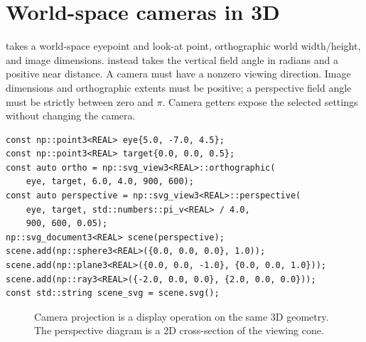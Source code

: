 \section{World-space cameras in 3D}
 takes a world-space eyepoint and look-at
point, orthographic world width/height, and image dimensions.
 instead takes the vertical field angle in
radians and a positive near distance. A camera must have a nonzero viewing
direction. Image dimensions and orthographic extents must be positive; a
perspective field angle must be strictly between zero and $\pi$. Camera
getters expose the selected settings without changing the camera.

\begin{lstlisting}
const np::point3<REAL> eye{5.0, -7.0, 4.5};
const np::point3<REAL> target{0.0, 0.0, 0.5};
const auto ortho = np::svg_view3<REAL>::orthographic(
    eye, target, 6.0, 4.0, 900, 600);
const auto perspective = np::svg_view3<REAL>::perspective(
    eye, target, std::numbers::pi_v<REAL> / 4.0,
    900, 600, 0.05);
np::svg_document3<REAL> scene(perspective);
scene.add(np::sphere3<REAL>({0.0, 0.0, 0.0}, 1.0));
scene.add(np::plane3<REAL>({0.0, 0.0, -1.0}, {0.0, 0.0, 1.0}));
scene.add(np::ray3<REAL>({-2.0, 0.0, 0.0}, {2.0, 0.0, 0.0}));
const std::string scene_svg = scene.svg();
\end{lstlisting}

\begin{figure}[htbp]\centering
{}
\caption{Camera projection is a display operation on the same 3D geometry.
The perspective diagram is a 2D cross-section of the viewing cone.}
\label{fig:camera-projection}
\end{figure}

